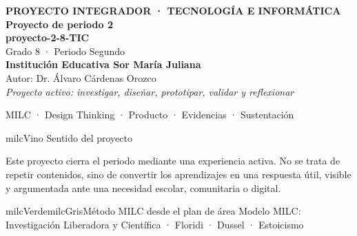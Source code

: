 \documentclass[11pt,letterpaper]{article}
\begin{document}
\thispagestyle{empty}

\vspace*{.85cm}
\begin{tcolorbox}[
  enhanced,colback=milcVino,colframe=milcVino,arc=12mm,width=.86\textwidth,
  boxrule=0pt,left=12mm,right=12mm,top=11mm,bottom=11mm,center,
  overlay={\draw[milcMagenta,line width=2pt,dash pattern=on 9pt off 8pt,rounded corners=10mm]
  ([xshift=7mm,yshift=-7mm]frame.north west) rectangle ([xshift=-7mm,yshift=7mm]frame.south east);}]
  \centering
  {\sffamily\bfseries\color{white}\fontsize{15}{17}\selectfont PROYECTO INTEGRADOR · TECNOLOGÍA E INFORMÁTICA}\\[1.0cm]
  {\sffamily\bfseries\color{white}\fontsize{30}{33}\selectfont Proyecto de periodo 2}\\[3mm]
  {\sffamily\bfseries\color{milcMostaza}\fontsize{25}{28}\selectfont proyecto-2-8-TIC}\\[8mm]
  {\sffamily\color{white}\Large Grado 8 · Periodo Segundo}\\[1.0cm]
  {\sffamily\bfseries\color{white}\large Institución Educativa Sor María Juliana}\\[2mm]
  {\sffamily\color{white}Autor: Dr. Álvaro Cárdenas Orozco}\\[4mm]
  {\sffamily\itshape\color{white}Proyecto activo: investigar, diseñar, prototipar, validar y reflexionar}
\end{tcolorbox}
\vfill
\begin{tcolorbox}[enhanced,colback=milcVino!72!black,colframe=milcVino!72!black,arc=5mm,boxrule=0pt,width=.86\textwidth,left=6mm,right=6mm,top=4mm,bottom=4mm,center]
{\color{white}\sffamily\small MILC · Design Thinking · Producto · Evidencias · Sustentación}
\end{tcolorbox}

\newpage
\begin{titlebox}{milcVino}
Sentido del proyecto
\end{titlebox}
\begin{multicols}{2}
Este proyecto cierra el periodo mediante una experiencia activa. No se trata de repetir contenidos, sino de convertir los aprendizajes en una respuesta útil, visible y argumentada ante una necesidad escolar, comunitaria o digital.

\columnbreak
\begin{softbox}{milcVerde}{milcGris}{Método MILC desde el plan de área}
Modelo MILC: Investigación Liberadora y Científica · Floridi · Dussel · Estoicismo
\end{softbox}
\end{multicols}
\end{document}
